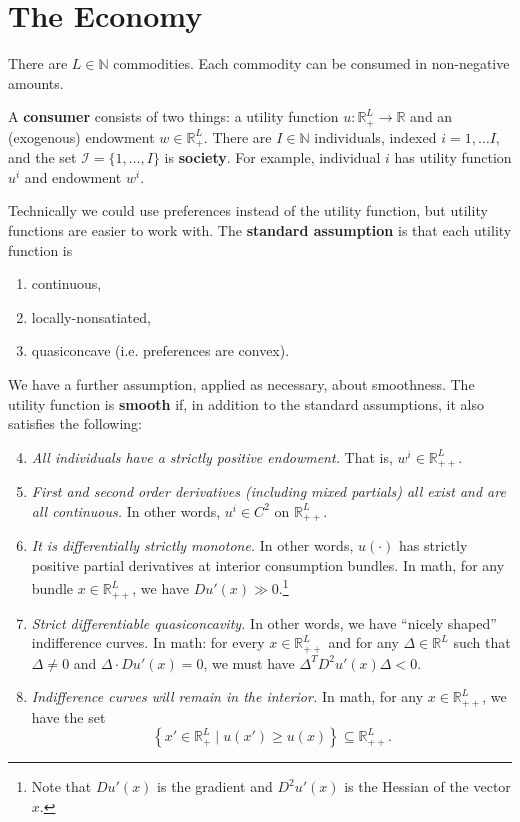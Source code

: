 \documentclass[11pt, twocolumn]{article}
\date{}
\newcommand{\N}{\mathbb{N}}
\newcommand{\R}{\mathbb{R}}
\theoremstyle{definition}
\begin{document}


\section*{The Economy}

There are $L \in \N$ commodities. Each commodity can be consumed in non-negative amounts.

A \textbf{consumer} consists of two things: a utility function $u:\R^L_+ \rightarrow \R$ and an (exogenous) endowment $w \in \R_+^L$. There are $I \in \N$ individuals, indexed $i=1, \hdots I$, and the set $\mathcal{I}=\{1, \hdots, I\}$ is \textbf{society}. For example, individual $i$ has utility function $u^i$ and endowment $w^i$. 

Technically we could use preferences instead of the utility function, but utility functions are easier to work with. The \textbf{standard assumption} is that each utility function is
\begin{enumerate}
	\item continuous,
	\item locally-nonsatiated,
	\item quasiconcave (i.e. preferences are convex).
\end{enumerate}
We have a further assumption, applied as necessary, about smoothness. The utility function is \textbf{smooth} if, in addition to the standard assumptions, it also satisfies the following:
\begin{enumerate}
	\setcounter{enumi}{3}
	\item \emph{All individuals have a strictly positive endowment.} That is, $w^i \in \R^L_{++}$. 
	\item \emph{First and second order derivatives (including mixed partials) all exist and are all continuous.} In other words, $u^i \in C^2$ on $\R^L_{++}$. 
	\item \emph{It is differentially strictly monotone.} In other words, $u(\cdot)$ has strictly positive partial derivatives at interior consumption bundles. In math, for any bundle $x \in \R^L_{++}$, we have $Du'(x) \gg 0$.\footnote{Note that $Du'(x)$ is the gradient and $D^2 u'(x)$ is the Hessian of the vector $x$.}
	\item \emph{Strict differentiable quasiconcavity.} In other words, we have ``nicely shaped'' indifference curves. In math: for every $x \in \R^L_{++}$ and for any $\Delta \in \R^L$ such that $\Delta \neq 0$ and $\Delta \cdot Du'(x)=0$, we must have $\Delta^TD^2 u'(x) \Delta <0$. 
	\item \emph{Indifference curves will remain in the interior.} In math, for any $x \in \R^L_{++}$, we have the set 
	\[ \left\{ x' \in \R^L_+ \;\big\vert\; u(x') \geq u(x) \right\} \subseteq \R^L_{++}. \]
\end{enumerate}
\end{document}
